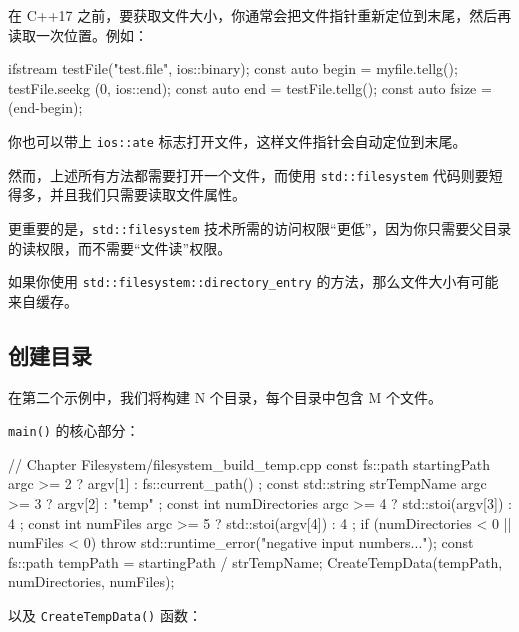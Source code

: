 在 C++17 之前，要获取文件大小，你通常会把文件指针重新定位到末尾，然后再读取一次位置。例如：

\begin{codebox}[cpp]
ifstream testFile("test.file", ios::binary);
const
auto begin = myfile.tellg();
testFile.seekg (0, ios::end);
const auto end = testFile.tellg();
const auto fsize =
(end-begin);
\end{codebox}

你也可以带上 \texttt{ios::ate} 标志打开文件，这样文件指针会自动定位到末尾。

然而，上述所有方法都需要打开一个文件，而使用 \texttt{std::filesystem} 代码则要短得多，并且我们只需要读取文件属性。

更重要的是，\texttt{std::filesystem} 技术所需的访问权限“更低”，因为你只需要父目录的读权限，而不需要“文件读”权限。

如果你使用 \texttt{std::filesystem::directory\_entry} 的方法，那么文件大小有可能来自缓存。

\subsection{创建目录}

在第二个示例中，我们将构建 N 个目录，每个目录中包含 M 个文件。

\texttt{main()} 的核心部分：

\begin{codebox}[cpp]
// Chapter Filesystem/filesystem_build_temp.cpp
const fs::path startingPath{ argc >= 2 ? argv[1] : fs::current_path() };
const std::string strTempName{ argc >= 3 ? argv[2] : "temp" };
const int numDirectories{ argc >= 4 ? std::stoi(argv[3]) : 4 };
const int numFiles{ argc >= 5 ? std::stoi(argv[4]) : 4 };
if (numDirectories < 0 || numFiles < 0)
    throw std::runtime_error("negative input numbers...");
const fs::path tempPath = startingPath / strTempName;
CreateTempData(tempPath, numDirectories, numFiles);
\end{codebox}

以及 \texttt{CreateTempData()} 函数：

